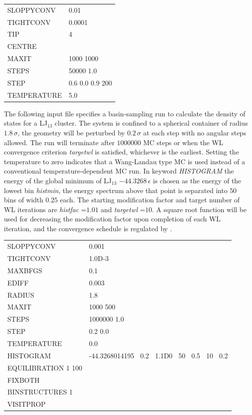 {\medskip
\begin{tabular}{ll}
SLOPPYCONV & 0.01 \\
TIGHTCONV & 0.0001 \\
TIP & 4 \\
CENTRE & \\
MAXIT & 1000 1000\\
STEPS & 50000 1.0\\
STEP & 0.6 0.0 0.9 200 \\
TEMPERATURE & 5.0\\
\end{tabular}
\medskip

\noindent The following input file specifies a basin-sampling run to calculate the density of states for 
a LJ$_{13}$ cluster. The system is
confined to a spherical container of radius $1.8\,\sigma$, 
the geometry will be perturbed by $0.2\,\sigma$ at each step with no
angular steps allowed. The run will terminate after $1000000$ 
MC steps or when the WL convergence criterion {\it targetwl}
is satisfied, whichever is the earliest. Setting the temperature to zero indicates that 
a Wang-Landau type MC is used instead of
a conventional temperature-dependent MC run. In keyword {\it HISTOGRAM\/}
the energy of the global minimum of LJ$_{13}$ $-44.3268\,\epsilon$ is chosen
as the energy of the lowest bin {\it histmin}, the energy spectrum above that point is 
separated into $50$ bins of width $0.25$ each. The
starting modification factor and target number of WL iterations are 
{\it histfac} =$ 1.01$ and {\it targetwl} =$ 10$. A square root function
will  be used for decreasing the modification factor upon completion of each WL iteration, 
and the convergence schedule is regulated by {}.  


\medskip
\begin{tabular}{ll}
SLOPPYCONV & 0.001 \\
TIGHTCONV & 1.0D-3 \\
MAXBFGS &  0.1 \\
EDIFF & 0.003 \\
RADIUS &  1.8 \\
MAXIT & 1000 500 \\
STEPS & 1000000 1.0 \\
STEP  & 0.2 0.0 \\
TEMPERATURE & 0.0 \\
HISTOGRAM & -44.3268014195 $\:$ 0.2 $\:$ 1.1D0 $\:$ 50 $\:$ 0.5 $\:$ 10 $\:$ 0.2 \\
EQUILIBRATION 1 100 \\
FIXBOTH \\
BINSTRUCTURES 1 \\
VISITPROP \\
\end{tabular}
\medskip

}
